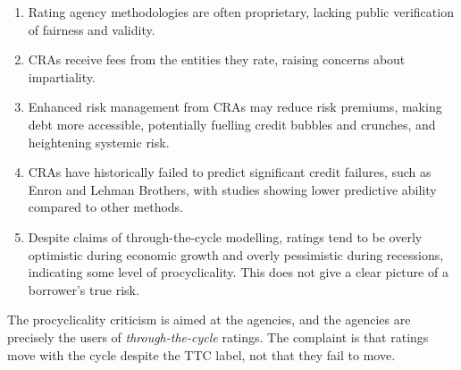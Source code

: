 \begin{enumerate}
\item {} Rating agency methodologies are often
proprietary, lacking public verification of fairness and validity.
\item {} CRAs receive fees from the entities
they rate, raising concerns about impartiality.
\item {} Enhanced risk management from CRAs may
reduce risk premiums, making debt more accessible, potentially fuelling credit
bubbles and crunches, and heightening systemic risk.
\item {} CRAs have historically failed to predict
significant credit failures, such as Enron and Lehman Brothers, with studies
showing lower predictive ability compared to other methods.
\item {} Despite claims of through-the-cycle modelling,
ratings tend to be overly optimistic during economic growth and overly
pessimistic during recessions, indicating some level of procyclicality. This does
not give a clear picture of a borrower's true risk.
\end{enumerate}

\begin{crtrapbox}
The procyclicality criticism is aimed at the agencies, and the agencies are
precisely the users of \emph{through-the-cycle} ratings. The complaint is that
ratings move with the cycle despite the TTC label, not that they fail to move.
\end{crtrapbox}
